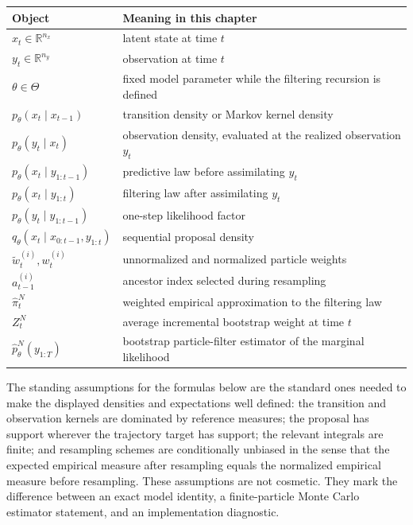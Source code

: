 \begin{center}
\small
\begin{tabular}{p{} p{}}
\toprule
Object & Meaning in this chapter \\
\midrule
$x_t\in\mathbb{R}^{n_x}$ & latent state at time $t$ \\
$y_t\in\mathbb{R}^{n_y}$ & observation at time $t$ \\
$\theta\in\Theta$ & fixed model parameter while the filtering recursion is
defined \\
$p_\theta(x_t\mid x_{t-1})$ & transition density or Markov kernel density \\
$p_\theta(y_t\mid x_t)$ & observation density, evaluated at the realized
observation $y_t$ \\
$p_\theta(x_t\mid y_{1:t-1})$ & predictive law before assimilating $y_t$ \\
$p_\theta(x_t\mid y_{1:t})$ & filtering law after assimilating $y_t$ \\
$p_\theta(y_t\mid y_{1:t-1})$ & one-step likelihood factor \\
$q_\theta(x_t\mid x_{0:t-1},y_{1:t})$ & sequential proposal density \\
$\tilde w_t^{(i)},w_t^{(i)}$ & unnormalized and normalized particle weights \\
$a_{t-1}^{(i)}$ & ancestor index selected during resampling \\
$\hat\pi_t^N$ & weighted empirical approximation to the filtering law \\
$Z_t^N$ & average incremental bootstrap weight at time $t$ \\
$\hat p_\theta^N(y_{1:T})$ & bootstrap particle-filter estimator of the
marginal likelihood \\
\bottomrule
\end{tabular}
\end{center}

The standing assumptions for the formulas below are the standard ones needed
to make the displayed densities and expectations well defined: the transition
and observation kernels are dominated by reference measures; the proposal has
support wherever the trajectory target has support; the relevant integrals are
finite; and resampling schemes are conditionally unbiased in the sense that the
expected empirical measure after resampling equals the normalized empirical
measure before resampling.  These assumptions are not cosmetic.  They mark the
difference between an exact model identity, a finite-particle Monte Carlo
estimator statement, and an implementation diagnostic.

